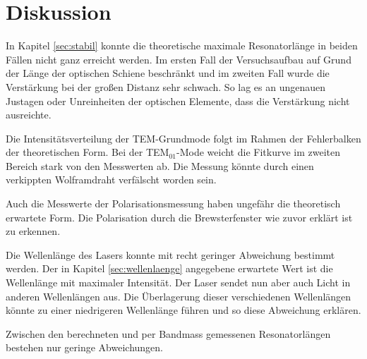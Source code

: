 \section{Diskussion}
\label{sec:Diskussion}

In Kapitel \ref{sec:stabil} konnte die theoretische maximale Resonatorlänge in beiden Fällen nicht ganz erreicht werden. Im ersten Fall der Versuchsaufbau auf Grund der Länge der optischen Schiene beschränkt und im zweiten Fall wurde die Verstärkung bei der großen Distanz sehr schwach. So lag es an ungenauen Justagen oder Unreinheiten der optischen Elemente, dass die Verstärkung nicht ausreichte.

Die Intensitätsverteilung der TEM-Grundmode folgt im Rahmen der Fehlerbalken der theoretischen Form. Bei der TEM$_{01}$-Mode weicht die Fitkurve im zweiten Bereich stark von den Messwerten ab. Die Messung könnte durch einen verkippten Wolframdraht verfälscht worden sein.

Auch die Messwerte der Polarisationsmessung haben ungefähr die theoretisch erwartete Form. Die Polarisation durch die Brewsterfenster wie zuvor erklärt ist zu erkennen.

Die Wellenlänge des Lasers konnte mit recht geringer Abweichung bestimmt werden. Der in Kapitel \ref{sec:wellenlaenge} angegebene erwartete Wert ist die Wellenlänge mit maximaler Intensität. Der Laser sendet nun aber auch Licht in anderen Wellenlängen aus. Die Überlagerung dieser verschiedenen Wellenlängen könnte zu einer niedrigeren Wellenlänge führen und so diese Abweichung erklären.

Zwischen den berechneten und per Bandmass gemessenen Resonatorlängen bestehen nur geringe Abweichungen.
